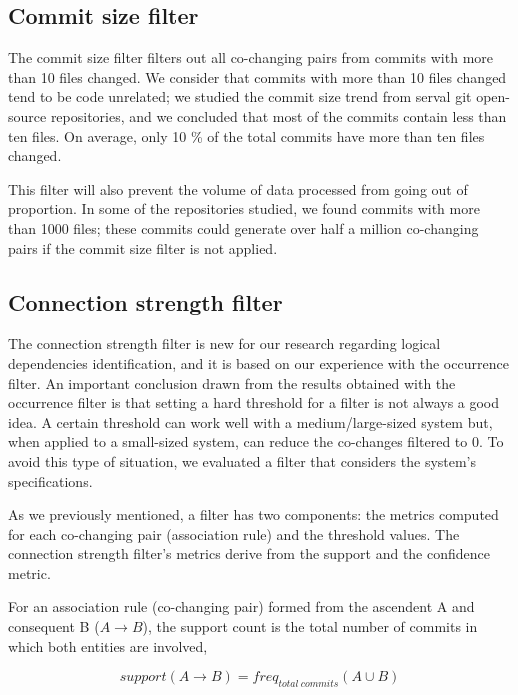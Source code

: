 \documentclass[runningheads]{comsis2}
\begin{document}
\subsection{Commit size filter}
\label{commit_filter}

The commit size filter filters out all co-changing pairs from commits with more than 10 files changed. We consider that commits with more than 10 files changed tend to be code unrelated; we studied the commit size trend from serval git open-source repositories, and we concluded that most of the commits contain less than ten files. On average, only 10 \% of the total commits have more than ten files changed. 

This filter will also prevent the volume of data processed from going out of proportion. In some of the repositories studied, we found commits with more than 1000 files; these commits could generate over half a million co-changing pairs if the commit size filter is not applied. 



\subsection{Connection strength filter}
\label{strength_filter}


The connection strength filter is new for our research regarding logical dependencies identification, and it is based on our experience with the occurrence filter.
An important conclusion drawn from the results obtained with the occurrence filter is that setting a hard threshold for a filter is not always a good idea. A certain threshold can work well with a medium/large-sized system but, when applied to a small-sized system, can reduce the co-changes filtered to 0. To avoid this type of situation, we evaluated a filter that considers the system's specifications. 


As we previously mentioned, a filter has two components: the metrics computed for each co-changing pair (association rule) and the threshold values. The connection strength filter's metrics derive from the support and the confidence metric.

For an association rule (co-changing pair) formed from the ascendent A and consequent B ($A \rightarrow B$), 
the support count is the total number of commits in which both entities are involved,


\begin{equation}
support (A \rightarrow B) = freq_{total\ commits} {(A \cup B)}
\end{equation}
\end{document}
